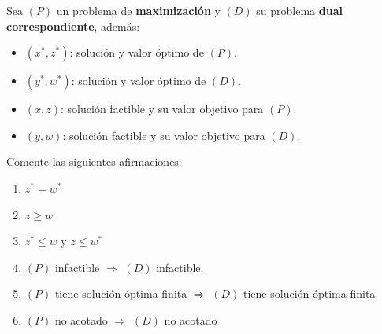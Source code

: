 Sea $(P)$ un problema de \textbf{maximización} y $(D)$ su problema \textbf{dual correspondiente}, además:

\begin{itemize}
    \item $(x^*, z^*)$: solución y valor óptimo de $(P)$.
    \item $(y^*, w^*)$: solución y valor óptimo de $(D)$.
    \item $(x, z)$: solución factible y su valor objetivo para $(P)$.
    \item $(y, w)$: solución factible y su valor objetivo para $(D)$.
\end{itemize}

Comente las siguientes afirmaciones:

\begin{enumerate}
    \item[(a)] $z^* = w^*$ \\

    \item[(b)] $z \geq w$ \\

    \item[(c)] $z^* \leq w$ y $z \leq w^*$ \\

    \item[(d)] $(P)$ infactible $\Rightarrow$ $(D)$ infactible.\\ 

    \item[(e)] $(P)$ tiene solución óptima finita $\Rightarrow$ $(D)$ tiene solución óptima finita \\

    \item[(f)] $(P)$ no acotado $\Rightarrow$ $(D)$ no acotado \\

\end{enumerate}
